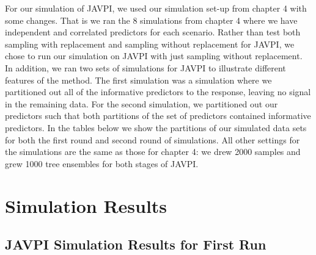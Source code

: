 \documentclass[12pt,twoside]{reedthesis}
\theoremstyle{definition}
\theoremstyle{definition}
\theoremstyle{definition}
\theoremstyle{remark}
\begin{document}
For our simulation of JAVPI, we used our simulation set-up from chapter
4 with some changes. That is we ran the 8 simulations from chapter 4
where we have independent and correlated predictors for each scenario.
Rather than test both sampling with replacement and sampling without
replacement for JAVPI, we chose to run our simulation on JAVPI with just
sampling without replacement. In addition, we ran two sets of
simulations for JAVPI to illustrate different features of the method.
The first simulation was a simulation where we partitioned out all of
the informative predictors to the response, leaving no signal in the
remaining data. For the second simulation, we partitioned out our
predictors such that both partitions of the set of predictors contained
informative predictors. In the tables below we show the partitions of
our simulated data sets for both the first round and second round of
simulations. All other settings for the simulations are the same as
those for chapter 4: we drew 2000 samples and grew 1000 tree ensembles
for both stages of JAVPI. \par 
\begin{table}

\caption{\label{tab:unnamed-chunk-26}Partitions for Simulation Runs 1 and 2, respectively}
\centering
{}
\end{table}
\section{Simulation Results}\label{simulation-results-1}

\subsection{JAVPI Simulation Results for First
Run}\label{javpi-simulation-results-for-first-run}
\end{document}
